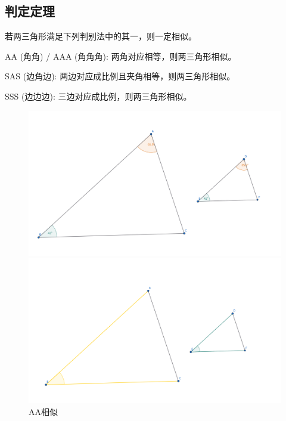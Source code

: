 \subsection{判定定理}
\begin{theorem}
    若两三角形满足下列判别法中的其一，则一定相似。

    AA (角角) / AAA (角角角): 两角对应相等，则两三角形相似。
    
    SAS (边角边): 两边对应成比例且夹角相等，则两三角形相似。

    SSS (边边边): 三边对应成比例，则两三角形相似。
\end{theorem}
\begin{figure}[h]
    \centering
    \hfill %
    \begin{minipage}[t]{0.3\textwidth}
        \centering
        \includegraphics[width=\linewidth]{figures/AA相似.png}
        \caption{AA相似}
    \end{minipage}
    \hfill %
    \begin{minipage}[t]{0.3\textwidth}
    \centering
    \includegraphics[width=\linewidth]{figures/SAS相似.png}

\end{minipage}
\end{figure}
